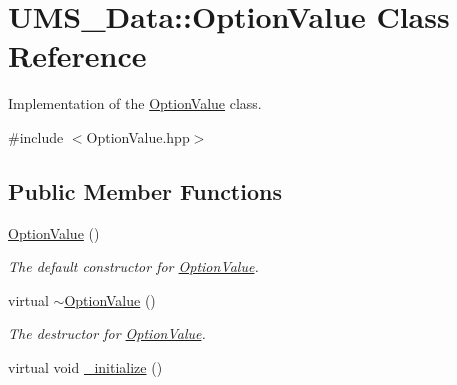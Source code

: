 \hypertarget{classUMS__Data_1_1OptionValue}{
\section{UMS\_\-Data::OptionValue Class Reference}
\label{classUMS__Data_1_1OptionValue}
}


Implementation of the \hyperlink{classUMS__Data_1_1OptionValue}{OptionValue} class.  




{\ttfamily \#include $<$OptionValue.hpp$>$}

\subsection*{Public Member Functions}
\begin{DoxyCompactItemize}
\item 
\hypertarget{classUMS__Data_1_1OptionValue_a05a29dfde817bb076b8dd8a0775530b9}{
\hyperlink{classUMS__Data_1_1OptionValue_a05a29dfde817bb076b8dd8a0775530b9}{OptionValue} ()}
\label{classUMS__Data_1_1OptionValue_a05a29dfde817bb076b8dd8a0775530b9}

\begin{DoxyCompactList}\small\item\em The default constructor for \hyperlink{classUMS__Data_1_1OptionValue}{OptionValue}. \item\end{DoxyCompactList}\item 
\hypertarget{classUMS__Data_1_1OptionValue_a13484b87f00eef3e9645373bbe239334}{
virtual \hyperlink{classUMS__Data_1_1OptionValue_a13484b87f00eef3e9645373bbe239334}{$\sim$OptionValue} ()}
\label{classUMS__Data_1_1OptionValue_a13484b87f00eef3e9645373bbe239334}

\begin{DoxyCompactList}\small\item\em The destructor for \hyperlink{classUMS__Data_1_1OptionValue}{OptionValue}. \item\end{DoxyCompactList}\item 
\hypertarget{classUMS__Data_1_1OptionValue_a3793f5c77adab7c3db8396f047ffe687}{
virtual void \hyperlink{classUMS__Data_1_1OptionValue_a3793f5c77adab7c3db8396f047ffe687}{\_\-initialize} ()}
\label{classUMS__Data_1_1OptionValue_a3793f5c77adab7c3db8396f047ffe687}


\end{DoxyCompactItemize}
